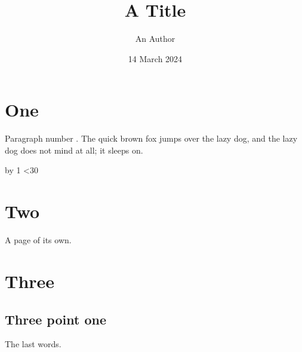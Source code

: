 \documentclass[titlepage]{article}
\title{A Title}
\author{An Author}
\date{14 March 2024}
\begin{document}
\maketitle
\tableofcontents
\section{One}
\newcount\n {}
\loop
Paragraph number \the\n. The quick brown fox jumps over the lazy dog,
and the lazy dog does not mind at all; it sleeps on.
\par
\advance\n by 1
\ifnum\n<30 \repeat
\newpage
\section{Two}
A page of its own.
\clearpage
\section{Three}
\subsection{Three point one}
The last words.
\end{document}
